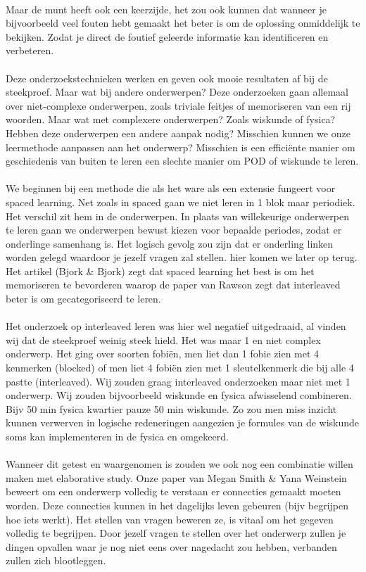 \documentclass{article}
\begin{document}
	\\
	Maar de munt heeft ook een keerzijde, het zou ook kunnen dat wanneer je bijvoorbeeld veel fouten hebt gemaakt het beter is om de oplossing onmiddelijk te bekijken. Zodat je direct de foutief geleerde informatie kan identificeren en verbeteren.
	\\\\
	Deze onderzoekstechnieken werken en geven ook mooie resultaten af bij de steekproef. Maar wat bij andere onderwerpen? Deze onderzoeken gaan allemaal over niet-complexe onderwerpen, zoals triviale feitjes of memoriseren van een rij woorden. Maar wat met complexere onderwerpen? Zoals wiskunde of fysica? Hebben deze onderwerpen een andere aanpak nodig? Misschien kunnen we onze leermethode aanpassen aan het onderwerp? Misschien is een efficiënte manier om geschiedenis van buiten te leren een slechte manier om POD of wiskunde te leren. 
	\\\\
	We beginnen bij een methode die als het ware als een extensie fungeert voor spaced learning. Net zoals in spaced gaan we niet leren in 1 blok maar periodiek. Het verschil zit hem in de onderwerpen. In plaats van willekeurige onderwerpen te leren gaan we onderwerpen bewust kiezen voor bepaalde periodes, zodat er onderlinge samenhang is. Het logisch gevolg zou zijn dat er onderling linken worden gelegd waardoor je jezelf vragen zal stellen. hier komen we later op terug. Het artikel (Bjork \& Bjork) zegt dat spaced learning het best is om het memoriseren te bevorderen waarop de paper van Rawson zegt dat interleaved beter is om gecategoriseerd te leren.
	\\\\
	Het onderzoek op interleaved leren was hier wel negatief uitgedraaid, al vinden wij dat de steekproef weinig steek hield. Het was maar 1 en niet complex onderwerp. Het ging over soorten fobiën, men liet dan 1 fobie zien met 4 kenmerken (blocked) of men liet 4 fobiën zien met 1 sleutelkenmerk die bij alle 4 pastte (interleaved). Wij zouden graag interleaved onderzoeken maar niet met 1 onderwerp. Wij zouden bijvoorbeeld wiskunde en fysica afwisselend combineren. Bijv 50 min fysica kwartier pauze 50 min wiskunde. Zo zou men miss inzicht kunnen verwerven in logische redeneringen aangezien je formules van de wiskunde soms kan implementeren in de fysica en omgekeerd.
	\\\\
	Wanneer dit getest en waargenomen is zouden we ook nog een combinatie willen maken met elaborative study. Onze paper van Megan Smith \& Yana Weinstein beweert om een onderwerp volledig te verstaan er connecties gemaakt moeten worden. Deze connecties kunnen in het dagelijks leven gebeuren (bijv begrijpen hoe iets werkt). Het stellen van vragen beweren ze, is vitaal om het gegeven volledig te begrijpen. Door jezelf vragen te stellen over het onderwerp zullen je dingen opvallen waar je nog niet eens over nagedacht zou hebben, verbanden zullen zich blootleggen.
\end{document}
